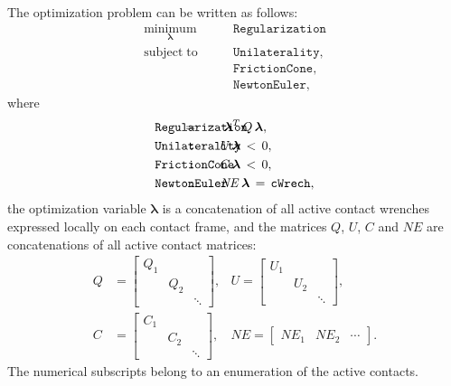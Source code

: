 \documentclass[12pt]{article}
\begin{document}
The optimization problem can be written as follows:
%
\begin{align}
    \underset{\bm{\lambda}}{\bm{\mathrm{minimum}}} &\qquad \texttt{Regularization}\\
    \bm{\mathrm{subject\;to}} &\qquad   \texttt{Unilaterality},      \nonumber\\
                  &\qquad  \texttt{FrictionCone},     \nonumber\\
                  & \qquad \texttt{NewtonEuler}, \nonumber
\end{align}
%
where 
%
\begin{align}
    &\texttt{Regularization}& &\hspace{-20mm}\!\!\!=  \qquad\bm{\lambda}^T \,Q \,\bm{\lambda}, \\
    &\texttt{Unilaterality}& &\hspace{-20mm}\texttt{:}\qquad U\,\bm{\lambda} \,<\, 0, \\
    &\texttt{FrictionCone}& &\hspace{-20mm}\texttt{:}\qquad C\,\bm{\lambda} \,<\, 0, \\
    &\texttt{NewtonEuler} & &\hspace{-20mm}\texttt{:}\qquad \mathit{NE} \,\bm{\lambda} \,=\, \texttt{cWrech},
\end{align}
%
the optimization variable $\bm{\lambda}$ is a concatenation of all active contact wrenches expressed locally on each contact frame, and the matrices $Q$, $U$, $C$ and $\mathit{NE}$ are concatenations of all active contact matrices:
%
\begin{align}
    Q & = \begin{bmatrix}
        Q_1 & & \\
         & Q_2 & \\
         & & \ddots
    \end{bmatrix}, & U = \begin{bmatrix}
        U_1 & & \\
         & U_2 & \\
         & & \ddots
    \end{bmatrix}, \\
    C & = \begin{bmatrix}
        C_1 & & \\
         & C_2 & \\
         & & \ddots
    \end{bmatrix}, & \mathit{NE} = \begin{bmatrix}
        \mathit{NE}_1 & \mathit{NE}_2 & \cdots 
    \end{bmatrix}.
\end{align}
%
The numerical subscripts belong to an enumeration of the active contacts.







\end{document}
